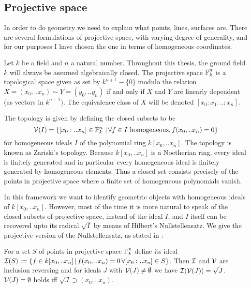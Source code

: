 \subsection{Projective space}

In order to do geometry we need to explain what points, lines, surfaces are.
There are several formulations of projective space, with varying degree of generality, and for our purposes I have chosen the one in terms of homogeneous coordinates.

Let $k$ be a field and $n$ a natural number.
Throughout this thesis, the ground field $k$ will always be assumed algebraically closed.
The projective space $\operatorname{\mathbb P}^n_k$ is a topological space given as set by  $k^{n+1} - \{ 0 \}$ modulo the relation $X=(x_0,..x_n) \sim Y=(y_0,..y_n)$ if and only if $X$ and $Y$ are linearly dependent (as vectors in $k^{n+1}$). The equivalence class of $X$ will be denoted $[x_0:x_1:..:x_n]$.

The topology is given by defining the closed subsets to be
\begin{equation}
\operatorname{\mathcal V}(I) =
\left\lbrace [x_0:..x_n] \in \operatorname{\mathbb P}^n_k\,|\,  \forall f\in I \text{ homogeneous}, f(x_0,..x_n) = 0\right\rbrace
\end{equation}
for homogeneous ideals $I$ of the polynomial ring $k[x_0,..x_n]$.
The topology is known as Zariski's topology.
Because $k[x_0,..x_n]$ is a Noetherian ring, every ideal is finitely generated and in particular every homogeneous ideal is finitely generated by homogeneous elements.
Thus a closed set consists precisely of the points in projective space where a finite set of homogeneous polynomials vanish.

In this framework we want to identify geometric objects with homogeneous ideals of $k[x_0,..x_n]$.
However, most of the time it is more natural to speak of the closed subsets of projective space, instead of the ideal $I$, and $I$ itself can be recovered upto its radical $\sqrt{I}$ by means of Hilbert's Nullstellensatz.
We give the projective version of the Nullstellensatz, as stated in \cite[section 5.3]{reid1988undergraduate}:

\begin{theorem}
For a set $S$ of points in projective space $\operatorname{\mathbb P}^n_k$ define its ideal $\operatorname{\mathcal I}(S) := \left\lbrace f \in k[x_0,..x_n]\,|\, f(x_0,..x_n) = 0\,\forall [x_0:..x_n] \in S\right\rbrace$.
Then $\operatorname{\mathcal I}$ and $\operatorname{\mathcal V}$ are inclusion reversing and for ideals $J$ with $\operatorname{\mathcal V}(J) \neq \emptyset$ we have $\operatorname{\mathcal I}(\operatorname{\mathcal V}(J)) = \sqrt{J}$.
$\operatorname{\mathcal V}(J) = \emptyset$ holds iff $\sqrt{J} \supset (x_0,..x_n)$.
\end{theorem}

